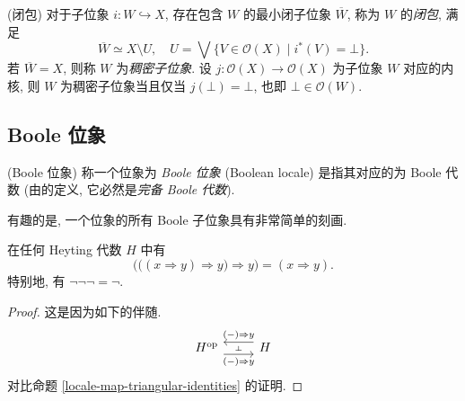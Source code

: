 \begin{propdef}
	{(闭包)}
	对于子位象 $i\colon W \hookrightarrow X$, 存在包含 $W$ 的最小闭子位象 $\overline{W}$, 称为 $W$ 的\emph{闭包},
	满足
	\[
	\overline{W} \simeq X\setminus U,\quad U= \bigvee \{V\in\mathcal O(X)\mid i^*(V) =\bot\}.
	\]
	若 $\overline{W} = X$, 则称 $W$ 为\emph{稠密子位象}.
	设 $j\colon \mathcal O(X)\to\mathcal O(X)$ 为子位象 $W$ 对应的内核, 则 $W$ 为稠密子位象当且仅当 $j(\bot) = \bot$, 也即 $\bot\in\mathcal O(W)$.
\end{propdef}

\subsection{Boole 位象}

\begin{definition}
	[label={Boolean-locale}]
	{(Boole 位象)}
	称一个位象为 \emph{Boole 位象} (Boolean locale) 是指其对应的\fm{}为 Boole 代数 (由\fm{}的定义, 它必然是\emph{完备 Boole 代数}).
\end{definition}

有趣的是, 一个位象的所有 Boole 子位象具有非常简单的刻画.

\newcommand{\booleansublocale}[1]{\text{B}(#1)}

\begin{prop}
	[label={xyyy-xy}]
	{}
	在任何 Heyting 代数 $H$ 中有
	\[
	\Big(\big((x\Rightarrow y) \Rightarrow y\big) \Rightarrow y\Big) = (x\Rightarrow y).
	\]
	特别地, 有 $\neg\neg\neg = \neg$.
\end{prop}
\begin{proof}
	这是因为如下的伴随.
	\[\begin{tikzcd}
		{H^{\op}} & {H}
		\arrow[""{name=0, anchor=center, inner sep=0}, "(-)\Rightarrow y"', shift right=2, from=1-1, to=1-2]
		\arrow[""{name=1, anchor=center, inner sep=0}, "(-)\Rightarrow y"', shift right=2, from=1-2, to=1-1]
		\arrow["\dashv"{anchor=center, rotate=-90}, draw=none, from=1, to=0]
	\end{tikzcd}\]
	对比命题 \ref{locale-map-triangular-identities} 的证明.
\end{proof}



